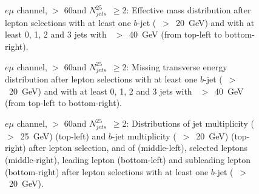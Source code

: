 \begin{figure}[h!]
\centering
{}
\caption{$e\mu$ channel, \met $>$ 60\GeV and $N_{jets}^{25}$~$\ge$2: Effective mass distribution after lepton selections with at least one $b$-jet (\pt~$>$~20~GeV) and with at least 0, 1, 2 and 3 jets with \pt~$>$~40~GeV (from top-left to bottom-right).}
\label{Fig:VP_em_1b_Meff}
\end{figure}
\begin{figure}[h!]
\centering
{}
\caption{$e\mu$ channel, \met $>$ 60\GeV and $N_{jets}^{25}$~$\ge$2: Missing transverse energy distribution after lepton selections with at least one $b$-jet (\pt~$>$~20~GeV) and with at least 0, 1, 2 and 3 jets with \pt~$>$~40~GeV (from top-left to bottom-right).}
\label{Fig:VP_em_1b_Met}
\end{figure}
\begin{figure}[h!]
\centering
{}
\caption{$e\mu$ channel, \met $>$ 60\GeV and $N_{jets}^{25}$~$\ge$2: Distributions of  jet multiplicity (\pt~$>$~25~GeV) (top-left) and $b$-jet multiplicity (\pt~$>$~20~GeV) (top-right) after lepton selection, and of \mt (middle-left), selected leptons \pt (middle-right), leading lepton \pt (bottom-left) and subleading lepton \pt (bottom-right) after lepton selections with at least one $b$-jet (\pt~$>$~20~GeV).}
\label{Fig:VP_em_1b_Njets_and_other}
\end{figure} 




